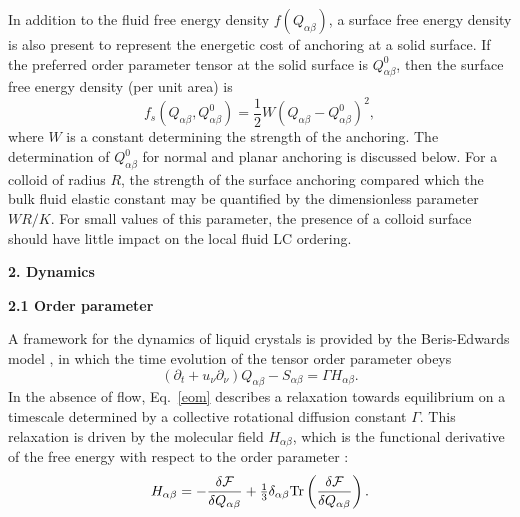 \documentclass[12pt,twoside]{article}
\begin{document}
In addition to the fluid free energy density $f(Q_{\alpha\beta})$, a surface
free energy density is also present to represent the energetic cost of
anchoring at a solid surface. If the preferred order parameter tensor
at the solid surface is $Q^0_{\alpha\beta}$, then the surface free energy
density (per unit area) is
\begin{equation}
f_s(Q_{\alpha\beta}, Q^0_{\alpha\beta})
= {\textstyle \frac{1}{2}}W(Q_{\alpha\beta} - Q^0_{\alpha\beta})^2,
\end{equation}
where $W$ is a constant determining the strength of the anchoring.
The determination of $Q^0_{\alpha\beta}$ for normal and planar anchoring is
discussed below. For a colloid of radius $R$, the strength of the surface
anchoring compared which the bulk fluid elastic constant may be quantified
by the dimensionless parameter $WR/K$. For small values of this parameter,
the presence of a colloid surface should have little impact on the local
fluid LC ordering.


{\bf 2. Dynamics}

{\bf 2.1 Order parameter}

A framework for the dynamics of liquid crystals is provided by the 
Beris-Edwards model \cite{beris}, in which the time evolution of the
tensor order parameter obeys
\begin{equation}
\label{eom}
\left(\partial_t+ u_\nu \partial_\nu \right) Q_{\alpha\beta} - S_{\alpha\beta}
= \Gamma H_{\alpha\beta}.
\end{equation}
In the absence of flow, Eq.~\ref{eom} describes a relaxation towards
equilibrium on a timescale determined by a collective rotational diffusion 
constant $\Gamma$. This relaxation is driven by the molecular field
$H_{\alpha\beta}$, which is the functional derivative of the free energy
with respect to the order parameter \cite{beris}:
\begin{equation}
H_{\alpha\beta} = -\frac{\delta {\cal F}} {\delta Q_{\alpha\beta}} 
+ {\textstyle \frac{1}{3}} \delta_{\alpha\beta} 
\mathrm{Tr}\left(\frac{\delta {\cal F}}{\delta Q_{\alpha\beta}}\right).
\end{equation}
\end{document}
